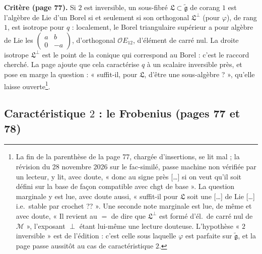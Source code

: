 \documentclass[11pt,a4paper]{article}
\begin{document}
\textbf{Critère (page 77).} Si $2$ est inversible, un sous-fibré
$\mathfrak{L} \subset \widetilde{\mathfrak{g}}$ de corang $1$ est l'algèbre de Lie d'un Borel
si et seulement si son orthogonal $\mathfrak{L}^{\perp}$ (pour $\varphi$), de rang $1$,
est isotrope pour $q$ : localement, le Borel triangulaire supérieur a pour
algèbre de Lie les $\begin{pmatrix} a & b \\ 0 & -a \end{pmatrix}$, d'orthogonal
$\mathcal{O} E_{12}$, d'élément de carré nul. La droite isotrope $\mathfrak{L}^{\perp}$ est
le point de la conique qui correspond au Borel : c'est le raccord cherché. La
page ajoute que cela caractérise $q$ à un scalaire inversible près, et pose en
marge la question : « suffit-il, pour $\mathfrak{L}$, d'être une sous-algèbre ? »,
qu'elle laisse ouverte\footnote{La fin de la parenthèse de la page 77, chargée
d'insertions, se lit mal ; la révision du 28 novembre 2026 sur le fac-similé, passe machine non vérifiée par un lecteur,
y lit, avec doute, « donc au signe près […] si on veut qu'il soit défini sur la
base de façon compatible avec chgt de base ». La question marginale y est lue,
avec doute aussi, « suffit-il pour $\mathfrak{L}$ soit une […] de Lie […] i.e.\
stable par crochet ?? ». Une seconde note marginale est lue, de même et avec
doute, « Il revient au $=$ de dire que $\mathfrak{L}^{\perp}$ est formé d'él.\ de
carré nul de $\mathcal{M}$ », l'exposant $\perp$ étant lui-même une lecture
douteuse. L'hypothèse « $2$ inversible » est de l'édition : c'est celle
sous laquelle $\varphi$ est parfaite sur $\widetilde{\mathfrak{g}}$, et la page passe
aussitôt au cas de caractéristique $2$.}.

\subsection*{Caractéristique $2$ : le Frobenius (pages 77 et 78)}
\end{document}
